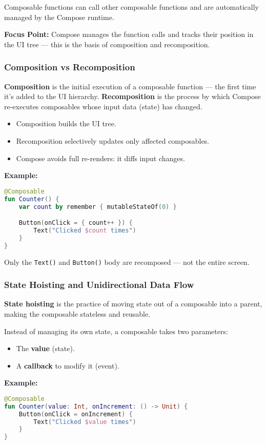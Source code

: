 \documentclass[a4paper,12pt]{article}
\begin{document}
Composable functions can call other composable functions and are automatically managed by the Compose runtime.

\textbf{Focus Point:} Compose manages the function calls and tracks their position in the UI tree — this is the basis of composition and recomposition.

\subsubsection{Composition vs Recomposition}
\textbf{Composition} is the initial execution of a composable function — the first time it's added to the UI hierarchy.  
\textbf{Recomposition} is the process by which Compose re-executes composables whose input data (state) has changed.

\begin{itemize}
  \item Composition builds the UI tree.
  \item Recomposition selectively updates only affected composables.
  \item Compose avoids full re-renders: it diffs input changes.
\end{itemize}

\textbf{Example:}
\begin{lstlisting}[language=Kotlin]
@Composable
fun Counter() {
    var count by remember { mutableStateOf(0) }

    Button(onClick = { count++ }) {
        Text("Clicked $count times")
    }
}
\end{lstlisting}

Only the \texttt{Text()} and \texttt{Button()} body are recomposed — not the entire screen.

\subsubsection{State Hoisting and Unidirectional Data Flow}
\textbf{State hoisting} is the practice of moving state out of a composable into a parent, making the composable stateless and reusable.

Instead of managing its own state, a composable takes two parameters:
\begin{itemize}
  \item The \textbf{value} (state).
  \item A \textbf{callback} to modify it (event).
\end{itemize}

\textbf{Example:}
\begin{lstlisting}[language=Kotlin]
@Composable
fun Counter(value: Int, onIncrement: () -> Unit) {
    Button(onClick = onIncrement) {
        Text("Clicked $value times")
    }
}
\end{lstlisting}
\end{document}
